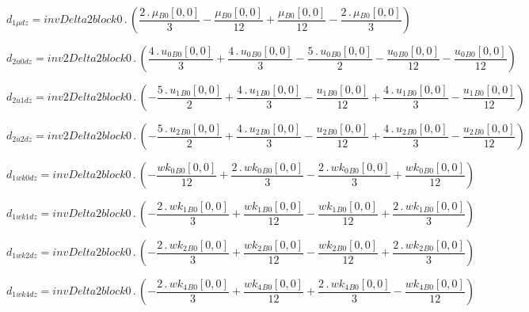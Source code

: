 \documentclass{article}
\begin{document}
\begin{dmath}d_{1 \mu dz} = invDelta2block0 \,.\, \left(\frac{2 \,.\, {\mu{_{B0}}}[{0,0}]}{3} - \frac{{\mu{_{B0}}}[{0,0}]}{12} + \frac{{\mu{_{B0}}}[{0,0}]}{12} - \frac{2 \,.\, {\mu{_{B0}}}[{0,0}]}{3}\right)\end{dmath}

\begin{dmath}d_{2 u0 dz} = inv2Delta2block0 \,.\, \left(\frac{4 \,.\, {u_{0}{_{B0}}}[{0,0}]}{3} + \frac{4 \,.\, {u_{0}{_{B0}}}[{0,0}]}{3} - \frac{5 \,.\, {u_{0}{_{B0}}}[{0,0}]}{2} - \frac{{u_{0}{_{B0}}}[{0,0}]}{12} - 
\frac{{u_{0}{_{B0}}}[{0,0}]}{12}\right)\end{dmath}

\begin{dmath}d_{2 u1 dz} = inv2Delta2block0 \,.\, \left(- \frac{5 \,.\, {u_{1}{_{B0}}}[{0,0}]}{2} + \frac{4 \,.\, {u_{1}{_{B0}}}[{0,0}]}{3} - \frac{{u_{1}{_{B0}}}[{0,0}]}{12} + \frac{4 \,.\, {u_{1}{_{B0}}}[{0,0}]}{3} - 
\frac{{u_{1}{_{B0}}}[{0,0}]}{12}\right)\end{dmath}

\begin{dmath}d_{2 u2 dz} = inv2Delta2block0 \,.\, \left(- \frac{5 \,.\, {u_{2}{_{B0}}}[{0,0}]}{2} + \frac{4 \,.\, {u_{2}{_{B0}}}[{0,0}]}{3} - \frac{{u_{2}{_{B0}}}[{0,0}]}{12} + \frac{4 \,.\, {u_{2}{_{B0}}}[{0,0}]}{3} - 
\frac{{u_{2}{_{B0}}}[{0,0}]}{12}\right)\end{dmath}

\begin{dmath}d_{1 wk0 dz} = invDelta2block0 \,.\, \left(- \frac{{wk_{0}{_{B0}}}[{0,0}]}{12} + \frac{2 \,.\, {wk_{0}{_{B0}}}[{0,0}]}{3} - \frac{2 \,.\, {wk_{0}{_{B0}}}[{0,0}]}{3} + \frac{{wk_{0}{_{B0}}}[{0,0}]}{12}\right)\end{dmath}

\begin{dmath}d_{1 wk1 dz} = invDelta2block0 \,.\, \left(- \frac{2 \,.\, {wk_{1}{_{B0}}}[{0,0}]}{3} + \frac{{wk_{1}{_{B0}}}[{0,0}]}{12} - \frac{{wk_{1}{_{B0}}}[{0,0}]}{12} + \frac{2 \,.\, {wk_{1}{_{B0}}}[{0,0}]}{3}\right)\end{dmath}

\begin{dmath}d_{1 wk2 dz} = invDelta2block0 \,.\, \left(- \frac{2 \,.\, {wk_{2}{_{B0}}}[{0,0}]}{3} + \frac{{wk_{2}{_{B0}}}[{0,0}]}{12} - \frac{{wk_{2}{_{B0}}}[{0,0}]}{12} + \frac{2 \,.\, {wk_{2}{_{B0}}}[{0,0}]}{3}\right)\end{dmath}

\begin{dmath}d_{1 wk4 dz} = invDelta2block0 \,.\, \left(- \frac{2 \,.\, {wk_{4}{_{B0}}}[{0,0}]}{3} + \frac{{wk_{4}{_{B0}}}[{0,0}]}{12} + \frac{2 \,.\, {wk_{4}{_{B0}}}[{0,0}]}{3} - \frac{{wk_{4}{_{B0}}}[{0,0}]}{12}\right)\end{dmath}
\end{document}
